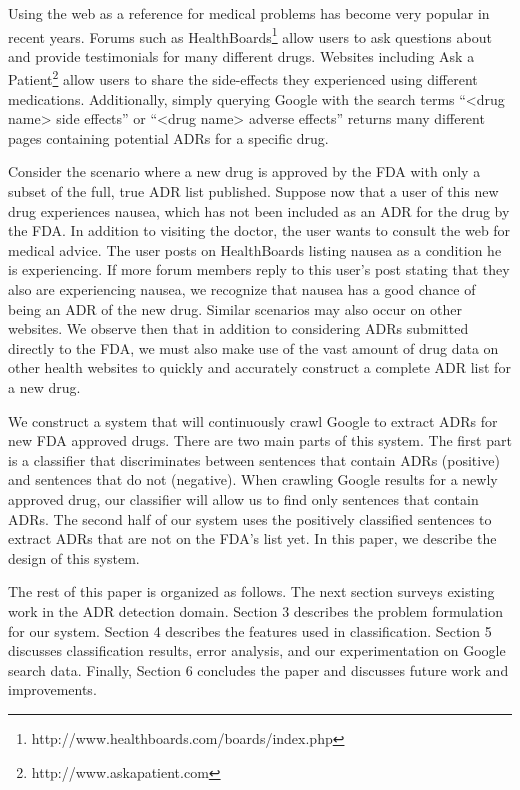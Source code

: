 \documentclass{acm_proc_article-sp}
\begin{document}
Using the web as a reference for medical problems has become very popular in recent years. Forums such as HealthBoards\footnote{http://www.healthboards.com/boards/index.php} allow users to ask questions about and provide testimonials for many different drugs. Websites including Ask a Patient\footnote{http://www.askapatient.com} allow users to share the side-effects they experienced using different medications. Additionally, simply querying Google with the search terms ``<drug name> side effects'' or ``<drug name> adverse effects'' returns many different pages containing potential ADRs for a specific drug. 

Consider the scenario where a new drug is approved by the FDA with only a subset of the full, true ADR list published. Suppose now that a user of this new drug experiences nausea, which has not been included as an ADR for the drug by the FDA. In addition to visiting the doctor, the user wants to consult the web for medical advice. The user posts on HealthBoards listing nausea as a condition he is experiencing. If more forum members reply to this user's post stating that they also are experiencing nausea, we recognize that nausea has a good chance of being an ADR of the new drug. Similar scenarios may also occur on other websites. We observe then that in addition to considering ADRs submitted directly to the FDA, we must also make use of the vast amount of drug data on other health websites to quickly and accurately construct a complete ADR list for a new drug.

We construct a system that will continuously crawl Google to extract ADRs for new FDA approved drugs. There are two main parts of this system. The first part is a classifier that discriminates between sentences that contain ADRs (positive) and sentences that do not (negative). When crawling Google results for a newly approved drug, our classifier will allow us to find only sentences that contain ADRs. The second half of our system uses the positively classified sentences to extract ADRs that are not on the FDA's list yet. In this paper, we describe the design of this system.

The rest of this paper is organized as follows. The next section surveys existing work in the ADR detection domain. Section 3 describes the problem formulation for our system. Section 4 describes the features used in classification. Section 5 discusses classification results, error analysis, and our experimentation on Google search data. Finally, Section 6 concludes the paper and discusses future work and improvements.
\end{document}
